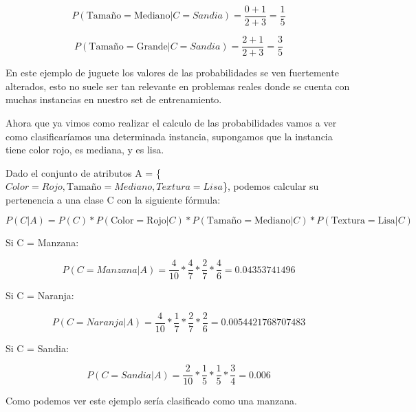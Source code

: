\documentclass[11pt,fleqn]{book} %
\begin{document}
\begin{equation}
P(\text{Tamaño}=\text{Mediano} | C=Sandia) = \frac{0+1}{2+3} = \frac{1}{5}
\label{eqn:tamMedSandia2} 
\end{equation}

\begin{equation}
P(\text{Tamaño}=\text{Grande} | C=Sandia) = \frac{2+1}{2+3} = \frac{3}{5}
\label{eqn:tamGraSandia2} 
\end{equation}

En este ejemplo de juguete los valores de las probabilidades se ven fuertemente alterados, esto no suele ser tan relevante en problemas reales donde se cuenta con muchas instancias en nuestro set de entrenamiento.

Ahora que ya vimos como realizar el calculo de las probabilidades vamos a ver como clasificaríamos una determinada instancia, supongamos que la instancia tiene color rojo, es mediana, y es lisa.

Dado el conjunto de atributos A = \{$Color = Rojo, \text{Tamaño} = Mediano, Textura=Lisa$\}, podemos calcular su pertenencia a una clase C con la siguiente fórmula:

\begin{equation}
P(C|A) = P(C)*P(\text{Color}=\text{Rojo} | C)*P(\text{Tamaño}=\text{Mediano} | C)*P(\text{Textura}=\text{Lisa} | C)
\label{eqn:clasificadorEjemplo} 
\end{equation}

Si C = Manzana:

\begin{equation}
P(C=Manzana|A) = \frac{4}{10}*\frac{4}{7}*\frac{2}{7}*\frac{4}{6} = 0.04353741496
\label{eqn:clasificadorEjemplo1} 
\end{equation}

Si C = Naranja:

\begin{equation}
P(C=Naranja|A) = \frac{4}{10}*\frac{1}{7}*\frac{2}{7}*\frac{2}{6} = 0.0054421768707483
\label{eqn:clasificadorEjemplo2} 
\end{equation}

Si C = Sandia:

\begin{equation}
P(C=Sandia|A) = \frac{2}{10}*\frac{1}{5}*\frac{1}{5}*\frac{3}{4} = 0.006
\label{eqn:clasificadorEjemplo3} 
\end{equation}

Como podemos ver este ejemplo sería clasificado como una manzana.\\
\end{document}
